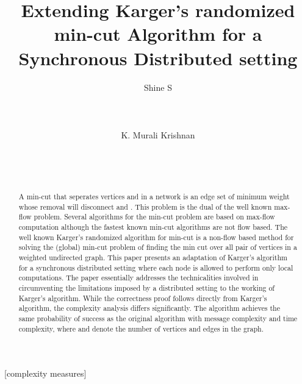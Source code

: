 \documentclass{acm_proc_article-sp}
\begin{document}
\title{Extending Karger's randomized min-cut Algorithm for a Synchronous Distributed setting}


 \author{
\alignauthor
Shine S \\
       \\
       \\
       \\
\alignauthor
K. Murali Krishnan \\
       \\
       \\
       \\
}


\maketitle
\begin{abstract}
A min-cut that seperates vertices  and  in a network is an edge
set of minimum weight whose removal will disconnect  and .  This
problem is the dual of the well known  max-flow problem. Several
algorithms for the min-cut problem are based on max-flow computation
although the fastest known min-cut algorithms are not flow based. The well known Karger's randomized algorithm for
min-cut is a non-flow based method for solving the
(global) min-cut problem of finding the min
 cut over all pair of vertices  in a weighted undirected
graph. This paper presents an adaptation of Karger's algorithm for a synchronous distributed setting
where each node is allowed to perform only local computations.  The paper essentially
addresses the technicalities involved in circumventing the limitations
imposed by a distributed setting to the working of Karger's algorithm.
While the correctness proof follows directly from Karger's algorithm,
the complexity analysis differs significantly.
The algorithm achieves the same probability of success as the original
algorithm with  message complexity and  time
complexity, where  and  denote the number of vertices and edges
in the graph.
\end{abstract}

[complexity measures]

\end{document}
